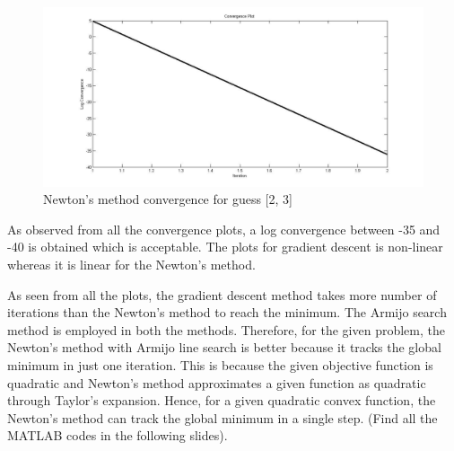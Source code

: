 \documentclass[12pt]{article}
\begin{document}
\begin{figure}[H]
\begin{center}
\includegraphics[scale=0.375]{conv1n.jpg}
\caption{Newton's method convergence for guess [2, 3]}  
\end{center}
\end{figure}
As observed from all the convergence plots, a log convergence between -35 and -40 is obtained which is acceptable. The plots for gradient descent is non-linear whereas it is linear for the Newton's method.
 
As seen from all the plots, the gradient descent method takes more number of iterations than the Newton's method to reach the minimum. The Armijo search method is employed in both the methods. Therefore, for the given problem, the Newton's method with Armijo line search is better because it tracks the global minimum in just one iteration. This is because the given objective function is quadratic and Newton's method approximates a given function as quadratic through Taylor's expansion. Hence, for a given quadratic convex function, the Newton's method can track the global minimum in a single step. (Find all the MATLAB codes in the following slides). 
\end{document}
